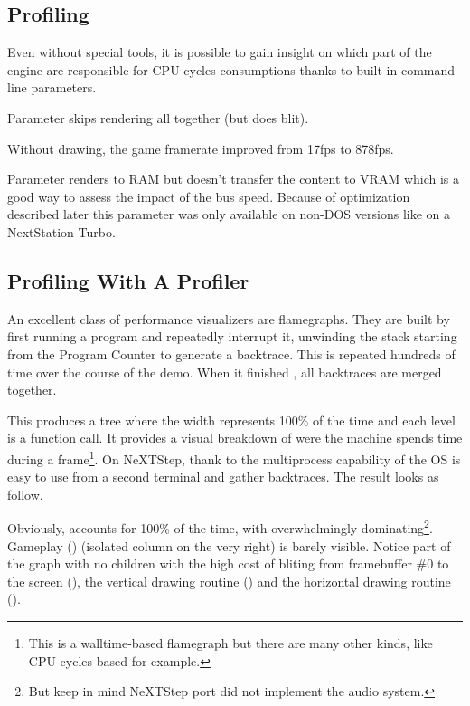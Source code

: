 \subsection{Profiling}
Even without special tools, it is possible to gain insight on which part of the engine are responsible for CPU cycles consumptions thanks to built-in command line parameters.\\
\par
Parameter  skips rendering all together (but does blit).\\
\par
\par
{}
\par
Without drawing, the game framerate improved from 17fps to 878fps.\\
\par
Parameter  renders to RAM but doesn't transfer the content to VRAM which is a good way to assess the impact of the bus speed. Because of optimization described later this parameter was only available on non-DOS versions like on a NextStation Turbo.\\
\par
{}


\vspace{-10mm}
\subsection{Profiling With A Profiler}
An excellent class of performance visualizers are flamegraphs. They are built by first running a program and repeatedly interrupt it, unwinding the stack starting from the Program Counter to generate a backtrace. This is repeated hundreds of time over the course of the demo. When it finished , all backtraces are merged together.\\
\par
 This produces a tree where the width represents 100\% of the time and each level is a function call. It provides a  visual breakdown of were the machine spends time during a frame\footnote{This is a walltime-based flamegraph but there are many other kinds, like CPU-cycles based for example.}. On NeXTStep, thank to the multiprocess capability of the OS is easy to use  from a second terminal and gather backtraces. The result looks as follow.\\
\par

\par
Obviously,  accounts for 100\% of the time, with  overwhelmingly dominating\footnote{But keep in mind NeXTStep port did not implement the audio system.}. Gameplay () (isolated column on the very right) is barely visible. Notice part of the graph with no children with the high cost of bliting from framebuffer \#0 to the screen (), the vertical drawing routine () and the horizontal drawing routine ().


